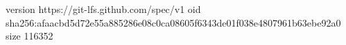 version https://git-lfs.github.com/spec/v1
oid sha256:afaacbd5d72e55a885286e08c0ca08605f6343de01f038e4807961b63ebe92a0
size 116352
